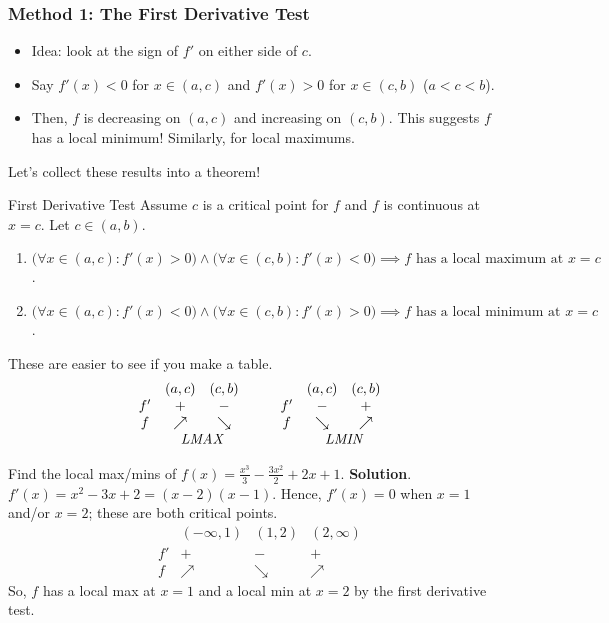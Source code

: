 \subsubsection*{Method 1: The First Derivative Test}
\begin{itemize}
    \item Idea: look at the sign of $ f' $ on either side of $ c $.
    \item Say $ f'(x)<0 $ for $ x\in(a,c) $ and $ f'(x)>0 $ for $ x\in(c,b) $ ($ a<c<b $).
    \item Then, $ f $ is decreasing on $ (a,c) $ and increasing on $ (c,b) $. This suggests $ f $
          has a local minimum! Similarly, for local maximums.
\end{itemize}
Let's collect these results into a theorem!
\begin{Theorem}{First Derivative Test}{}
    Assume $ c $ is a critical point for $ f $ and $ f $ is continuous at $ x=c $.
    Let $ c\in (a,b) $.
    \begin{enumerate}[(1)]
        \item $ \bigl(\forall x\in (a,c):f'(x)>0\bigr)\land \bigl(\forall x\in(c,b):f'(x)<0\bigr)
                  \implies f\text{ has a local maximum at }x=c $.
        \item $ \bigl(\forall x\in (a,c):f'(x)<0\bigr)\land \bigl(\forall x\in(c,b):f'(x)>0\bigr)
                  \implies f\text{ has a local minimum at }x=c $.
    \end{enumerate}
\end{Theorem}
These are easier to see if you make a table.
\[ \begin{array}{ccc}
           & (a,c)                           & (c,b)    \\
        f' & +                               & -        \\
        f  & \nearrow                        & \searrow \\
           & \multicolumn{2}{c}{\emph{LMAX}}
    \end{array}\qquad
    \begin{array}{ccc}
           & (a,c)                           & (c,b)    \\
        f' & -                               & +        \\
        f  & \searrow                        & \nearrow \\
           & \multicolumn{2}{c}{\emph{LMIN}}
    \end{array} \]
\begin{Example}{}{}
    Find the local max/mins of $ f(x)=\frac{x^3}{3}-\frac{3x^2}{2}+2x+1 $.
    \tcblower{}
    \textbf{Solution}. $ f'(x)=x^2-3x+2=(x-2)(x-1) $. Hence, $ f'(x)=0 $ when $ x=1 $ and/or $ x=2 $;
    these are both critical points.
    \[ \begin{array}{cccc}
               & (-\infty,1) & (1,2)    & (2,\infty) \\
            f' & +           & -        & +          \\
            f  & \nearrow    & \searrow & \nearrow
        \end{array} \]
    So, $ f $ has a local max at $ x=1 $ and a local min at $ x=2 $ by the first derivative test.
\end{Example}
